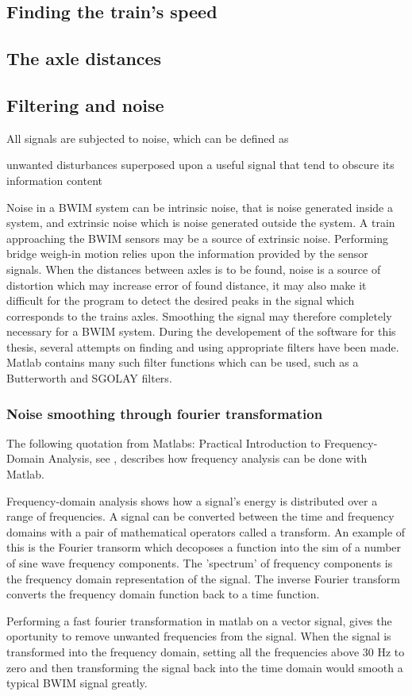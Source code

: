 \subsection{Finding the train's speed}

\subsection{The axle distances}

\subsection{Filtering and noise}
All signals are subjected to noise, which can be defined as
\begin{displayquote}
	unwanted disturbances superposed upon a useful signal that tend to obscure its information content \cite{IEEE_electronics}
\end{displayquote}
Noise in a BWIM system can be intrinsic noise, that is noise generated inside a system, and extrinsic noise which is noise generated outside the system. A train approaching the BWIM sensors may be a source of extrinsic noise.
Performing bridge weigh-in motion relies upon the information provided by the sensor signals. When the distances between axles is to be found, noise is a source of distortion which may increase error of found distance, it may also make it difficult for the program to detect the desired peaks in the signal which corresponds to the trains axles. Smoothing the signal may therefore completely necessary for a BWIM system. During the developement of the software for this thesis, several attempts on finding and using appropriate filters have been made. Matlab contains many such filter functions which can be used, such as a Butterworth and SGOLAY filters.
\subsubsection{Noise smoothing through fourier transformation}
The following quotation from  Matlabs: Practical Introduction to Frequency-Domain Analysis, see \cite{frequency_domain_analysis}, describes how frequency analysis can be done with Matlab.
\begin{displayquote}
	Frequency-domain analysis shows how a signal's energy is distributed over a range of frequencies. A signal can be converted between the time and frequency domains with a pair of mathematical operators called a transform. An example of this is the Fourier transorm which decoposes a function into the sim of a number of sine wave frequency components. The 'spectrum' of frequency components is the frequency domain representation of the signal. The inverse Fourier transform converts the frequency domain function back to a time function.
\end{displayquote}

Performing a fast fourier transformation in matlab on a vector signal, gives the oportunity to remove unwanted frequencies from the signal. When the signal is transformed into the frequency domain, setting all the frequencies above 30 Hz to zero and then transforming the signal back into the time domain would smooth a typical BWIM signal greatly.
